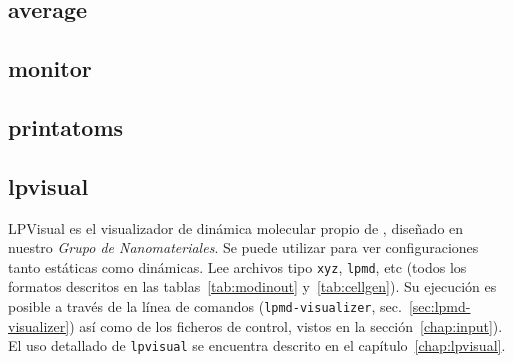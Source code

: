 \subsection {average}

\subsection {monitor}

\subsection {printatoms}

\subsection{lpvisual}

LPVisual es el visualizador de din\'amica molecular propio de {\lpmd},
dise\~nado en nuestro \emph{Grupo de Nanomateriales}. Se puede utilizar para ver
configuraciones tanto est\'aticas como din\'amicas. Lee archivos tipo {\tt xyz},
{\tt lpmd}, etc (todos los formatos descritos en las tablas~\ref{tab:modinout}
y~\ref{tab:cellgen}). Su ejecuci\'on es posible a trav\'es de la l\'inea de
comandos ({\tt lpmd-visualizer}, sec.~\ref{sec:lpmd-visualizer}) as\'i como de
los ficheros de control, vistos en la secci\'on~\ref{chap:input}). El uso
detallado de {\tt lpvisual} se encuentra descrito en el
cap\'itulo~\ref{chap:lpvisual}.


